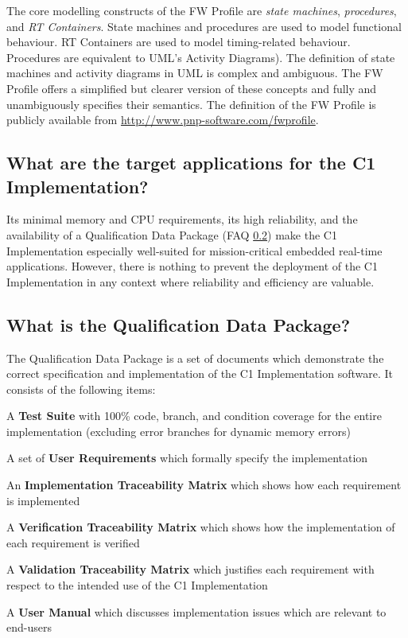 \documentclass[a4paper,10pt]{article}
\newenvironment{fw_itemize}						%
{\begin{itemize}
  \setlength{\itemsep}{1mm}
  \setlength{\parskip}{0pt}
  \setlength{\parsep}{0pt}}
{\end{itemize}}
\begin{document}
The core modelling constructs of the FW Profile are \emph{state machines},  \emph{procedures}, and \emph{RT Containers}. State machines and procedures are used to model functional behaviour. RT Containers are used to model timing-related behaviour. Procedures are equivalent to UML's Activity Diagrams). The definition of state machines and activity diagrams in UML is complex and ambiguous. The FW Profile offers a simplified but clearer version of these concepts and fully and 
unambiguously specifies their semantics. The definition of the FW Profile is publicly available from \url{http://www.pnp-software.com/fwprofile}.

\subsection{What are the target applications for the C1 Implementation?}
Its minimal memory and CPU requirements, its high reliability, and the availability of a Qualification Data Package (FAQ \ref{faq:qualification_data_package}) make the C1 Implementation especially well-suited for mission-critical embedded real-time applications. However, there is nothing to prevent the deployment of the C1 Implementation in any context where reliability and efficiency are valuable.

\subsection{What is the Qualification Data Package?}\label{faq:qualification_data_package}
The Qualification Data Package is a set of documents which demonstrate the correct specification and implementation of the C1 Implementation software. 
It consists of the following items:

\begin{fw_itemize} 
\item A \textbf{Test Suite} with 100\% code, branch, and condition coverage for the entire implementation (excluding error branches for dynamic memory errors)
\item A set of \textbf{User Requirements} which formally specify the implementation
\item An \textbf{Implementation Traceability Matrix} which shows how each requirement is implemented
\item A \textbf{Verification Traceability Matrix} which shows how the implementation of each requirement is verified
\item A \textbf{Validation Traceability Matrix} which justifies each requirement with respect to the intended use of the C1 Implementation
\item A \textbf{User Manual} which discusses implementation issues which are relevant to end-users
\end{fw_itemize}
\end{document}
